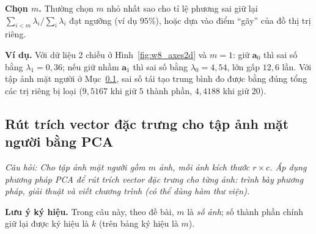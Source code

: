 \textbf{Chọn $m$.} Thường chọn $m$ nhỏ nhất sao cho tỉ lệ phương sai giữ lại $\sum_{i<m}\lambda_i / \sum_i\lambda_i$ đạt ngưỡng (ví dụ $95\%$), hoặc dựa vào điểm ``gãy'' của đồ thị trị riêng.

\textbf{Ví dụ.} Với dữ liệu 2 chiều ở Hình~\ref{fig:w8_axes2d} và $m = 1$: giữ $\mathbf{a}_0$ thì sai số bằng $\lambda_1 = 0{,}36$; nếu giữ nhầm $\mathbf{a}_1$ thì sai số bằng $\lambda_0 = 4{,}54$, lớn gấp $12{,}6$ lần. Với tập ảnh mặt người ở Mục~\ref{subsec:w8_eigenfaces}, sai số tái tạo trung bình đo được bằng đúng tổng các trị riêng bị loại ($9{,}5167$ khi giữ $5$ thành phần, $4{,}4188$ khi giữ $20$).

\subsection{Rút trích vector đặc trưng cho tập ảnh mặt người bằng PCA}
\label{subsec:w8_eigenfaces}

\textit{Câu hỏi: Cho tập ảnh mặt người gồm $m$ ảnh, mỗi ảnh kích thước $r \times c$. Áp dụng phương pháp PCA để rút trích vector đặc trưng cho từng ảnh: trình bày phương pháp, giải thuật và viết chương trình (có thể dùng hàm thư viện).}

\textbf{Lưu ý ký hiệu.} Trong câu này, theo đề bài, $m$ là \emph{số ảnh}; số thành phần chính giữ lại được ký hiệu là $k$ (trên bảng ký hiệu là $m$).

